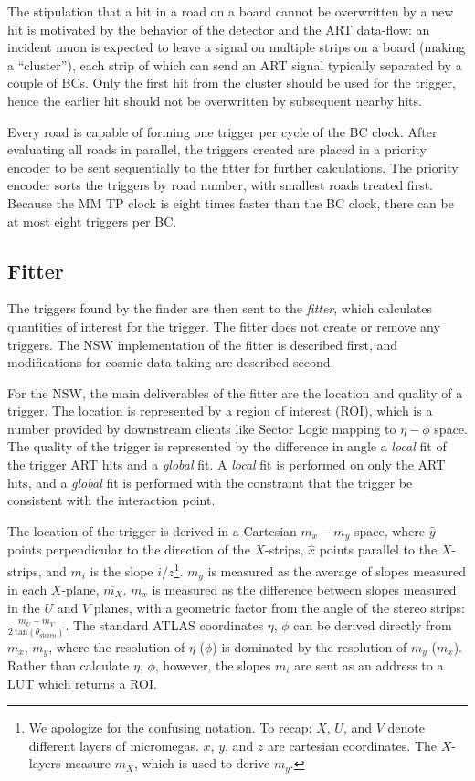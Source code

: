The stipulation that a hit in a road on a board cannot be overwritten by a new hit is motivated by the behavior of the detector and the ART data-flow: an incident muon is expected to leave a signal on multiple strips on a board (making a ``cluster''), each strip of which can send an ART signal typically separated by a couple of BCs. Only the first hit from the cluster should be used for the trigger, hence the earlier hit should not be overwritten by subsequent nearby hits. 

Every road is capable of forming one trigger per cycle of the BC clock. After evaluating all roads in parallel, the triggers created are placed in a priority encoder to be sent sequentially to the fitter for further calculations. The priority encoder sorts the triggers by road number, with smallest roads treated first. Because the MM TP clock is eight times faster than the BC clock, there can be at most eight triggers per BC.

\subsection{Fitter}
\label{sec:alg-fitter}

The triggers found by the finder are then sent to the \textit{fitter}, which calculates quantities of interest for the trigger. The fitter does not create or remove any triggers. The NSW implementation of the fitter is described first, and modifications for cosmic data-taking are described second.

For the NSW, the main deliverables of the fitter are the location and quality of a trigger. The location is represented by a region of interest (ROI), which is a number provided by downstream clients like Sector Logic mapping to $\eta-\phi$ space. The quality of the trigger is represented by the difference in angle a \textit{local} fit of the trigger ART hits and a \textit{global} fit. A \textit{local} fit is performed on only the ART hits, and a \textit{global} fit is performed with the constraint that the trigger be consistent with the interaction point.

The location of the trigger is derived in a Cartesian $m_x-m_y$ space, where $\hat{y}$ points perpendicular to the direction of the $X$-strips, $\hat{x}$ points parallel to the $X$-strips, and $m_i$ is the slope $i/z$\footnote{We apologize for the confusing notation. To recap: $X$, $U$, and $V$ denote different layers of micromegas. $x$, $y$, and $z$ are cartesian coordinates. The $X$-layers measure $m_X$, which is used to derive $m_y$.}. $m_y$ is measured as the average of slopes measured in each $X$-plane, $\overline{m_X}$. $m_x$ is measured as the difference between slopes measured in the $U$ and $V$ planes, with a geometric factor from the angle of the stereo strips: $\frac{m_U - m_V}{2\ \text{tan}(\theta_\text{stereo})}$. The standard ATLAS coordinates $\eta$, $\phi$ can be derived directly from $m_x$, $m_y$, where the resolution of $\eta$ ($\phi$) is dominated by the resolution of $m_y$ ($m_x$). Rather than calculate $\eta$, $\phi$, however, the slopes $m_i$ are sent as an address to a LUT which returns a ROI.

